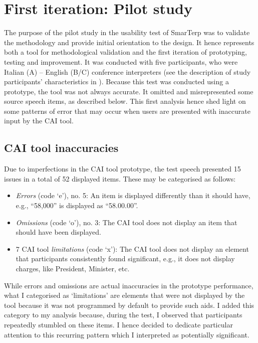 \chapter{First iteration: Pilot study}\label{ch:first_iteration}

The purpose of the pilot study in the usability test of SmarTerp was to validate the methodology and provide initial orientation to the design. It hence represents both a tool for methodological validation and the first iteration of prototyping, testing and improvement. It was conducted with five participants, who were Italian (A) – English (B/C) conference interpreters (see the description of study participants’ characteristics in ). Because this test was conducted using a prototype, the tool was not always accurate. It omitted and misrepresented some source speech items, as described below. This first analysis hence shed light on some patterns of error that may occur when users are presented with inaccurate input by the CAI tool.

\section{CAI tool inaccuracies}

Due to imperfections in the CAI tool prototype, the test speech presented 15 issues in a total of 52 displayed items. These may be categorised as follows:

\begin{itemize}
    \item \textit{Errors} (code `e'), no. 5: An item is displayed differently than it should have, e.g., ``58,000'' is displayed as ``58.00.00''.
    \item \textit{Omissions} (code `o'), no. 3: The CAI tool does not display an item that should have been displayed.
    \item 7 CAI tool \textit{limitations} (code `x'): The CAI tool does not display an element that participants consistently found significant, e.g., it does not display charges, like President, Minister, etc.
\end{itemize}
While errors and omissions are actual inaccuracies in the prototype performance, what I categorised as `limitations' are elements that were not displayed by the tool because it was not programmed by default to provide such aids. I added this category to my analysis because, during the test, I observed that participants repeatedly stumbled on these items.  I hence decided to dedicate particular attention to this recurring pattern which I interpreted as potentially significant.

